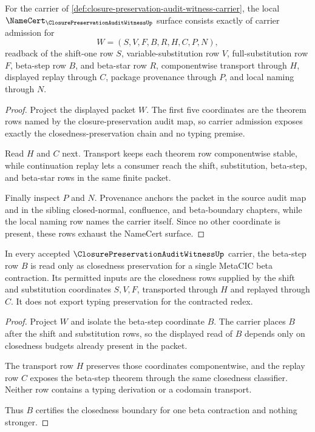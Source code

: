 \begin{theorem}
\label{thm:closure-preservation-audit-witness-namecert-obligations}
For the carrier of \autoref{def:closure-preservation-audit-witness-carrier}, the local $\NameCert_{\ClosurePreservationAuditWitnessUp}$ surface consists exactly of carrier admission for
$$
W=(S,V,F,B,R,H,C,P,N),
$$
readback of the shift-one row $S$, variable-substitution row $V$, full-substitution row $F$, beta-step row $B$, and beta-star row $R$, componentwise transport through $H$, displayed replay through $C$, package provenance through $P$, and local naming through $N$.
\end{theorem}
\begin{proof}
Project the displayed packet $W$. The first five coordinates are the theorem rows named by the closure-preservation audit map, so carrier admission exposes exactly the closedness-preservation chain and no typing premise.

Read $H$ and $C$ next. Transport keeps each theorem row componentwise stable, while continuation replay lets a consumer reach the shift, substitution, beta-step, and beta-star rows in the same finite packet.

Finally inspect $P$ and $N$. Provenance anchors the packet in the source audit map and in the sibling closed-normal, confluence, and beta-boundary chapters, while the local naming row names the carrier itself. Since no other coordinate is present, these rows exhaust the NameCert surface.
\end{proof}

\begin{theorem}
\label{thm:closure-preservation-audit-witness-beta-step-row}
In every accepted $\ClosurePreservationAuditWitnessUp$ carrier, the beta-step row $B$ is read only as closedness preservation for a single MetaCIC beta contraction. Its permitted inputs are the closedness rows supplied by the shift and substitution coordinates $S,V,F$, transported through $H$ and replayed through $C$. It does not export typing preservation for the contracted redex.
\end{theorem}
\begin{proof}
Project $W$ and isolate the beta-step coordinate $B$. The carrier places $B$ after the shift and substitution rows, so the displayed read of $B$ depends only on closedness budgets already present in the packet.

The transport row $H$ preserves those coordinates componentwise, and the replay row $C$ exposes the beta-step theorem through the same closedness classifier. Neither row contains a typing derivation or a codomain transport.

Thus $B$ certifies the closedness boundary for one beta contraction and nothing stronger.
\end{proof}


